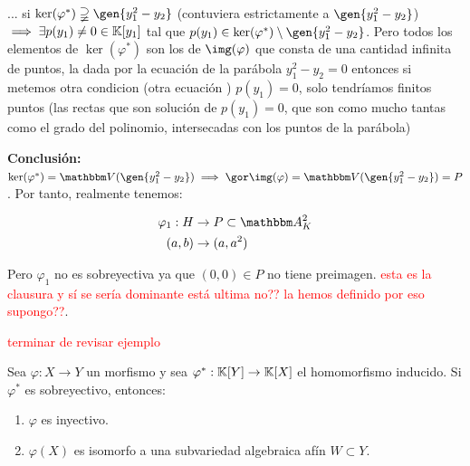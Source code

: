 \begin{example}
	... si $\ker(\varphi^*) \supsetneqq \gen{y_1^2-y_2}$ (contuviera estrictamente a $\gen{y_1^2-y_2}$) $\implies \exists p(y_1)\neq 0 \in \mathbb{K}[y_1]$ tal que $p(y_1) \in \ker(\varphi^*) \setminus \gen{y_1^2 - y_2}$. Pero todos los elementos de $\ker(\varphi^*)$ son los de $\img(\varphi)$ que consta de una cantidad infinita de puntos, la dada por la ecuación de la parábola $y_1^2-y_2=0$ entonces si metemos otra condicion (otra ecuación ) $p(y_1)=0$, solo tendríamos finitos puntos (las rectas que son solución de $p(y_1)=0$, que son como mucho tantas como el grado del polinomio, intersecadas con los puntos de la parábola)

	\textbf{Conclusión: }$ \ker(\varphi^*)=\V(\gen{y_1^2-y_2}) \implies \cls{\img(\varphi)}= \V(\gen{y_1^2-y_2})=P$. Por tanto, realmente tenemos:

	\begin{align*}
		\varphi_1: H & \rightarrow P \subset \A^2_K\\
		(a,b) & \rightarrow (a,a^2)
	\end{align*}

	Pero $\varphi_1$ no es sobreyectiva ya que $(0,0) \in P$ no tiene preimagen. \textcolor{red}{esta es la clausura y sí se sería dominante está ultima no?? la hemos definido por eso supongo??}.

	\textcolor{red}{terminar de revisar ejemplo}
\end{example}

\begin{lemma}
	Sea $\varphi: X \rightarrow Y$ un morfismo y sea $\varphi^*: \mathbb{K}[Y]\rightarrow \mathbb{K}[X]$ el homomorfismo inducido. Si $\varphi^*$ es sobreyectivo, entonces:
		\begin{enumerate}
			\item $\varphi$ es inyectivo.
			\item $\varphi(X)$ es isomorfo a una subvariedad algebraica afín $W \subset Y$.
		\end{enumerate}
\end{lemma}

